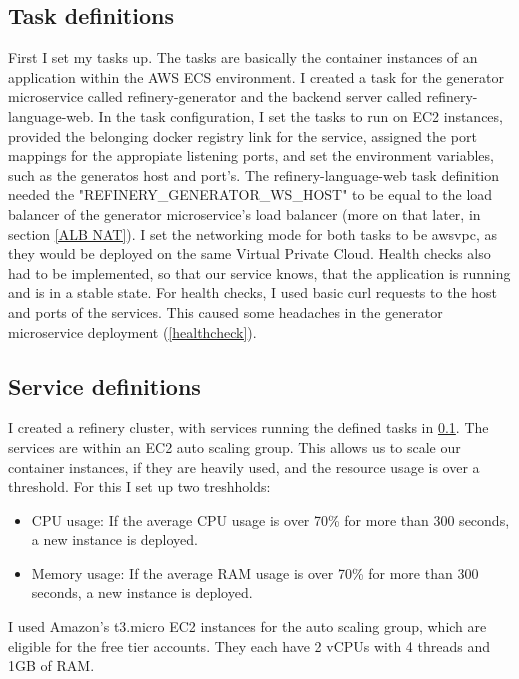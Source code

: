 		\subsection{Task definitions} \label{awstasks}
			First I set my tasks up. The tasks are basically the container instances of an application within the AWS ECS environment. 
			I created a task
			for the generator microservice called refinery-generator and the backend server called refinery-language-web.
			In the task configuration, I set the tasks to run on EC2 instances, provided the belonging docker registry link for the service,
			assigned the port mappings for the appropiate listening ports, and set the environment variables, 
			such as the generatos host and port's. The refinery-language-web task definition needed the "REFINERY\_GENERATOR\_WS\_HOST" to 
			be equal to the load balancer of the generator microservice's load balancer (more on that later, in section \ref{ALB NAT}).
			I set the networking mode for both tasks to be awsvpc, as they would be deployed on the same Virtual Private Cloud.
			Health checks also had to be implemented, so that our service knows, that the application is running and is in a stable state.
			For health checks, I used basic curl requests to the host and ports of the services. This caused some headaches in the 
			generator microservice deployment (\ref{healthcheck}).

		\subsection{Service definitions} \label{awsservices}
			I created a refinery cluster, with services running the defined tasks in \ref{awstasks}. The services are within an EC2 auto scaling group. 
			This allows us to scale our container instances, if they are heavily used, and the resource usage is over a threshold.
			For this I set up two treshholds:
			\begin{itemize}
				\item CPU usage: If the average CPU usage is over 70\% for more than 300 seconds, a new instance is deployed.
				\item Memory usage: If the average RAM usage is over 70\% for more than 300 seconds, a new instance is deployed.
			\end{itemize}
			I used Amazon's t3.micro EC2 instances for the auto scaling group, which are eligible for the free tier accounts. 
			They each have 2 vCPUs with 4 threads and 1GB of RAM.
		
